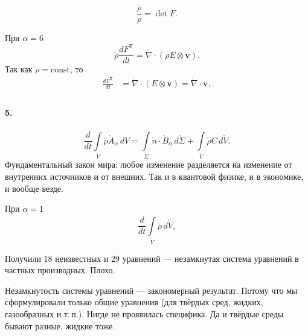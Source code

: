 \[
    \boxed{
    \frac{\mathring{\rho}}{\rho} = \det F.}
\]


При $ \alpha = 6 $  
\[
  \mathring{\rho} \frac{dF^{\mathsf T}}{dt} = \mathring{\nabla}\cdot (\rho E
  \otimes \mathbf{v}).
\]
Так как $ \mathring{\rho} = \mathrm{const} $, то  
\begin{align*}
  \frac{dF^{\mathsf T}}{dt} &= \mathring{\nabla} \cdot (E \otimes \mathbf{v}) =
  \mathring{\nabla} \cdot \mathbf{v},\\
\end{align*}


\paragraph{5.}

 
\[
  \frac{d}{dt} \int\limits_{\mathring{V}}^{}\mathring{\rho}
  \mathring{A}_\alpha\,dV = \int\limits_{\mathring\Sigma}^{}\mathring n\cdot
  \mathring{B}_\alpha\,d\mathring{\Sigma} +
  \int\limits_{\mathring{V}}^{}\mathring{\rho} C\,d\mathring V.
\]
Фундаментальный закон мира: любое изменение разделяется на изменение от
внутренних источников и от внешних. Так и в квантовой физике, и в экономике, и
вообще везде.


При $ \alpha = 1 $  
\[
  \frac{d}{dt} \int\limits_{\mathring{V}}^{}\mathring{\rho}\,d\mathring{V},
\]


Получили 18 неизвестных и 29 уравнений --- незамкнутая система уравнений в
частных производных. Плохо.

Незамкнутость системы уравнений --- закономерный результат. Потому что мы
сформулировали только общие уравнения (для твёрдых сред, жидких, газообразных и т.\,п.).
Нигде не проявилась специфика. Да и твёрдые среды бывают разные, жидкие тоже.
